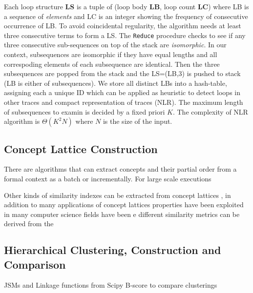 Each loop structure \textbf{LS} is a tuple of (loop body \textbf{LB}, loop count \textbf{LC}) where LB is a sequence of \textit{elements} and LC is an integer showing the frequency of consecutive occurrence of LB. To avoid coincidental regularity, the algorithm needs at least three consecutive terms to form a LS. The \texttt{Reduce} procedure checks to see if any three consecutive sub-sequences on top of the stack are \textit{isomorphic}. In our context, subsequences are isomorphic if they have equal lengths and all correspoding elements of each subsequence are identical. Then the three subsequences are popped from the stack and the LS=(LB,3) is pushed to stack (LB is either of subsequences). We store all distinct LBs into a hash-table, assigning each a unique ID which can be applied as heuristic to detect loops in other traces and compact representation of traces (NLR). 
 The maximum length of subsequences to examin is decided by a fixed priori $K$.  The complexity of NLR algorithm is $\Theta(K^2N)$ where $N$ is the size of the input. 
%



\subsection{Concept Lattice Construction}
\label{subsec:algo-cl}


There are algorithms that can extract concepts and their partial order from a formal context as a batch or incrementally. For large scale executions 

Other kinds of similarity indexes can be extracted from concept lattices \cite{Alqadah2011}, in addition to many applications of concept lattices  properties have been exploited in many computer science fields have been e different similarity metrics can be derived from the

\subsection{Hierarchical Clustering, Construction and Comparison}
 \label{subsec:algo-bscore}
JSMs and Linkage functions from Scipy 
B-score to compare clusterings